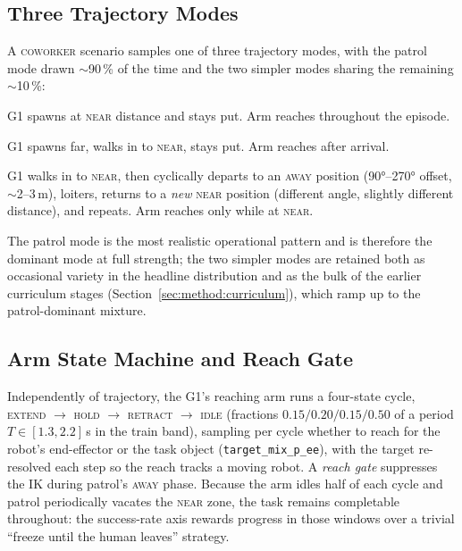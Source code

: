 \documentclass[11pt,a4paper]{report}
\newcommand{\coworker}{\textsc{coworker}}
\begin{document}
\subsection{Three Trajectory Modes}
\label{sec:bench:coworker:traj}

A \coworker{} scenario samples one of three trajectory modes, with
the patrol mode drawn $\sim$90\,\% of the time and the two simpler
modes sharing the remaining $\sim$10\,\%:

\begin{description}[leftmargin=2em,topsep=2pt,itemsep=2pt]
\item[\textsc{stationary}] G1 spawns at \textsc{near} distance and
  stays put. Arm reaches throughout the episode.
\item[\textsc{approach-loiter-depart}] G1 spawns far, walks in to
  \textsc{near}, stays put. Arm reaches after arrival.
\item[\textsc{coworker-patrol}] G1 walks in to \textsc{near}, then
  cyclically departs to an \textsc{away} position (90°--270°
  offset, $\sim$2--3\,m), loiters, returns to a \emph{new}
  \textsc{near} position (different angle, slightly different
  distance), and repeats. Arm reaches only while at \textsc{near}.
\end{description}

The patrol mode is the most realistic operational pattern and is
therefore the dominant mode at full strength; the two simpler modes
are retained both as occasional variety in the headline distribution
and as the bulk of the earlier curriculum stages
(Section~\ref{sec:method:curriculum}), which ramp up to the
patrol-dominant mixture.

\subsection{Arm State Machine and Reach Gate}
\label{sec:bench:coworker:arm}

Independently of trajectory, the G1's reaching arm runs a four-state
cycle, \textsc{extend} $\to$ \textsc{hold} $\to$ \textsc{retract}
$\to$ \textsc{idle} (fractions $0.15/0.20/0.15/0.50$ of a period
$T \in [1.3, 2.2]$\,s in the train band), sampling per cycle whether
to reach for the robot's end-effector or the task object
(\texttt{target\_mix\_p\_ee}), with the target re-resolved each step
so the reach tracks a moving robot. A \emph{reach gate} suppresses
the IK during patrol's \textsc{away} phase. Because the arm idles
half of each cycle and patrol periodically vacates the \textsc{near}
zone, the task remains completable throughout: the success-rate axis
rewards progress in those windows over a trivial ``freeze until the
human leaves'' strategy.
\end{document}
